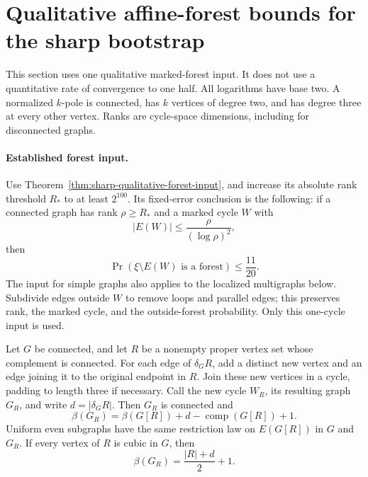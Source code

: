 \section{Qualitative affine-forest bounds for the sharp bootstrap}
\label{sec:path-qualitative-affine-bootstrap}

This section uses one qualitative marked-forest input.
It does not use a quantitative rate of convergence to one half.
All logarithms have base two.
A normalized $k$-pole is connected, has $k$ vertices of degree two, and has degree three at every other vertex.
Ranks are cycle-space dimensions, including for disconnected graphs.

\paragraph{Established forest input.}
Use Theorem~\ref{thm:sharp-qualitative-forest-input}, and increase its absolute rank threshold $R_*$ to at least $2^{100}$.
Its fixed-error conclusion is the following: if a connected graph has rank $\rho\ge R_*$ and a marked cycle $W$ with
\[
 |E(W)|\le\frac{\rho}{(\log\rho)^2},
\]
then
\begin{equation}\label{eq:path-qualitative-forest-input}
 \Pr(\xi\setminus E(W)\text{ is a forest})\le\frac{11}{20}.
\end{equation}
The input for simple graphs also applies to the localized multigraphs below.
Subdivide edges outside $W$ to remove loops and parallel edges; this preserves rank, the marked cycle, and the outside-forest probability.
Only this one-cycle input is used.

\begin{lemma}
\label{lem:path-qualitative-localization}
Let $G$ be connected, and let $R$ be a nonempty proper vertex set whose complement is connected.
For each edge of $\delta_G R$, add a distinct new vertex and an edge joining it to the original endpoint in $R$.
Join these new vertices in a cycle, padding to length three if necessary.
Call the new cycle $W_R$, its resulting graph $G_R$, and write $d=|\delta_G R|$.
Then $G_R$ is connected and
\[
 \beta(G_R)=\beta(G[R])+d-\operatorname{comp}(G[R])+1.
\]
Uniform even subgraphs have the same restriction law on $E(G[R])$ in $G$ and $G_R$.
If every vertex of $R$ is cubic in $G$, then
\[
 \beta(G_R)=\frac{|R|+d}{2}+1.
\]
\end{lemma}

